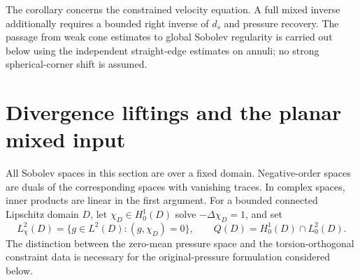\documentclass[11pt,a4paper]{article}
\theoremstyle{remark}
\numberwithin{equation}{section}
\begin{document}
The corollary concerns the constrained velocity equation. A full mixed
inverse additionally requires a bounded right inverse of $d_s$ and pressure
recovery. The passage from weak cone estimates to global Sobolev regularity
is carried out below using the independent straight-edge estimates
on annuli; no strong spherical-corner shift is assumed.



\section{Divergence liftings and the planar mixed input}
\label{sec:g-prelim}

All Sobolev spaces in this section are over a fixed domain. Negative-order
spaces are duals of the corresponding spaces with vanishing traces. In complex
spaces, inner products are linear in the first argument. For a bounded
connected Lipschitz domain $D$, let $\chi_D\in H^1_0(D)$ solve
$-\Delta\chi_D=1$, and set
\[
 L^2_\chi(D)=\{g\in L^2(D):(g,\chi_D)=0\},\qquad
 Q(D)=H^1_0(D)\cap L^2_0(D).
\]
The distinction between the zero-mean pressure space and the torsion-orthogonal
constraint data is necessary for the original-pressure formulation considered
below.
\end{document}
